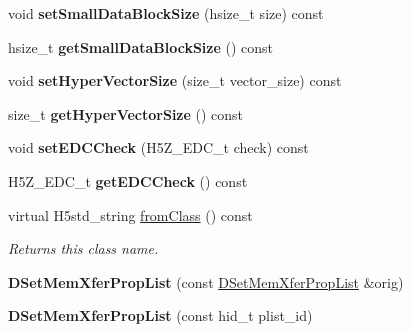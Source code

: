 \begin{DoxyCompactItemize}
\item 
\mbox{\label{class_h5_1_1_d_set_mem_xfer_prop_list_ae2f65e65c2724c6875394e58243a720e}} 
void {\bfseries set\+Small\+Data\+Block\+Size} (hsize\+\_\+t size) const
\item 
\mbox{\label{class_h5_1_1_d_set_mem_xfer_prop_list_af362373b7fc036f0f119388ad060ea26}} 
hsize\+\_\+t {\bfseries get\+Small\+Data\+Block\+Size} () const
\item 
\mbox{\label{class_h5_1_1_d_set_mem_xfer_prop_list_a92dcd6b83f38db19e8594b90a4841756}} 
void {\bfseries set\+Hyper\+Vector\+Size} (size\+\_\+t vector\+\_\+size) const
\item 
\mbox{\label{class_h5_1_1_d_set_mem_xfer_prop_list_a2df51bb5174d4a5a0caf64046b041dc0}} 
size\+\_\+t {\bfseries get\+Hyper\+Vector\+Size} () const
\item 
\mbox{\label{class_h5_1_1_d_set_mem_xfer_prop_list_ad6892a2114a39bf785465ec4ee67de95}} 
void {\bfseries set\+E\+D\+C\+Check} (H5\+Z\+\_\+\+E\+D\+C\+\_\+t check) const
\item 
\mbox{\label{class_h5_1_1_d_set_mem_xfer_prop_list_a3309ef2d038cc23950593fcb2bbaa9f4}} 
H5\+Z\+\_\+\+E\+D\+C\+\_\+t {\bfseries get\+E\+D\+C\+Check} () const
\item 
\mbox{\label{class_h5_1_1_d_set_mem_xfer_prop_list_ad08ac681bb8862694b6387b40d4083e9}} 
virtual H5std\+\_\+string \hyperlink{class_h5_1_1_d_set_mem_xfer_prop_list_ad08ac681bb8862694b6387b40d4083e9}{from\+Class} () const
\begin{DoxyCompactList}\small\item\em Returns this class name. \end{DoxyCompactList}\item 
\mbox{\label{class_h5_1_1_d_set_mem_xfer_prop_list_a437776bf9e34fe035f980ab776fda887}} 
{\bfseries D\+Set\+Mem\+Xfer\+Prop\+List} (const \hyperlink{class_h5_1_1_d_set_mem_xfer_prop_list}{D\+Set\+Mem\+Xfer\+Prop\+List} \&orig)
\item 
\mbox{\label{class_h5_1_1_d_set_mem_xfer_prop_list_a333f85dc819a03eef6f89a872c1ec14c}} 
{\bfseries D\+Set\+Mem\+Xfer\+Prop\+List} (const hid\+\_\+t plist\+\_\+id)
\end{DoxyCompactItemize}
